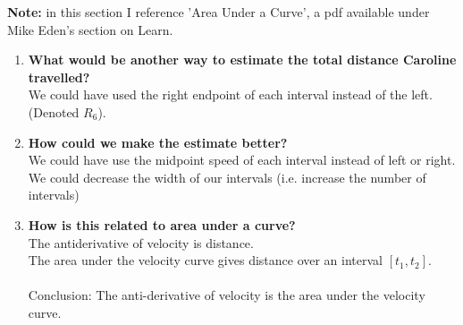 \documentclass{letter}
\begin{document}
	\textbf{Note: } in this section I reference 'Area Under a Curve', a pdf available under Mike Eden's section on Learn.
	
	\begin{enumerate}
		\item \textbf{What would be another way to estimate the total distance Caroline travelled?}\\
		We could have used the right endpoint of each interval instead of the left. (Denoted $R_6$).
		\item \textbf{How could we make the estimate better?}\\
			We could have use the midpoint speed of each interval instead of left or right.\\
			We could decrease the width of our intervals (i.e. increase the number of intervals)
		\item \textbf{How is this related to area under a curve?}\\
		The antiderivative of velocity is distance.\\
		The area under the velocity curve gives distance over an interval $[t_1, t_2]$.\\\\
		Conclusion: The anti-derivative of velocity is the area under the velocity curve.
	\end{enumerate}
\end{document}
